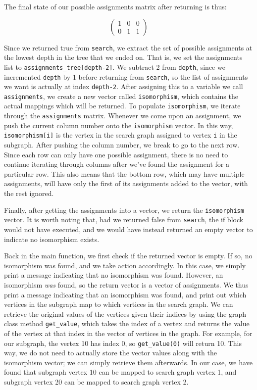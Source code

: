 \documentclass{article}
\begin{document}
  The final state of our possible assignments matrix after returning is thus:

  \[ \begin{pmatrix}
      1 & 0 & 0 \\
      0 & 1 & 1
  \end{pmatrix} \]

  Since we returned true from \texttt{search}, we extract the set of possible assignments at the lowest depth in the tree that we ended on. That is, we set the assignments list to \texttt{assignments\_tree[depth-2]}. We subtract 2 from \texttt{depth}, since we incremented \texttt{depth} by 1 before returning from \texttt{search}, so the list of assignments we want is actually at index \texttt{depth-2}. After assigning this to a variable we call \texttt{assignments}, we create a new vector called \texttt{isomorphism}, which contains the actual mappings which will be returned. To populate \texttt{isomorphism}, we iterate through the \texttt{assignments} matrix. Whenever we come upon an assignment, we push the current column number onto the \texttt{isomorphism} vector. In this way, \texttt{isomorphism[i]} is the vertex in the search graph assigned to vertex \texttt{i} in the subgraph. After pushing the column number, we break to go to the next row. Since each row can only have one possible assignment, there is no need to continue iterating through columns after we've found the assignment for a particular row. This also means that the bottom row, which may have multiple assignments, will have only the first of its assignments added to the vector, with the rest ignored.

  Finally, after getting the assignments into a vector, we return the \texttt{isomorphism} vector. It is worth noting that, had we returned false from \texttt{search}, the if block would not have executed, and we would have instead returned an empty vector to indicate no isomorphism exists.

  Back in the main function, we first check if the returned vector is empty. If so, no isomorphism was found, and we take action accordingly. In this case, we simply print a message indicating that no isomorphism was found. However, an isomorphism \textit{was} found, so the return vector is a vector of assignments. We thus print a message indicating that an isomorphism was found, and print out which vertices in the subgraph map to which vertices in the search graph. We can retrieve the original values of the vertices given their indices by using the graph class method \texttt{get\_value}, which takes the index of a vertex and returns the value of the vertex at that index in the vector of vertices in the graph. For example, for our subgraph, the vertex 10 has index 0, so \texttt{get\_value(0)} will return 10. This way, we do not need to actually store the vector values along with the isomorphism vector; we can simply retrieve them afterwards. In our case, we have found that subgraph vertex 10 can be mapped to search graph vertex 1, and subgraph vertex 20 can be mapped to search graph vertex 2. 
  
\end{document}
